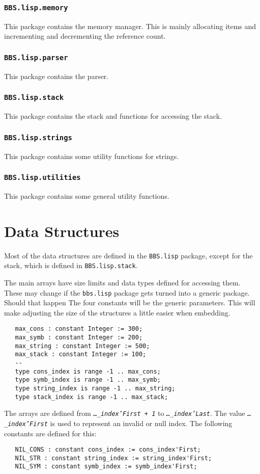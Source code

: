 \documentclass[10pt, openany]{book}
\newcommand{\package}[1]{\texttt{#1}}
\newcommand{\constant}[1]{\emph{\texttt{#1}}}
\newcommand{\keyword}[1]{\texttt{#1}}
\begin{document}
\subsubsection{\package{BBS.lisp.memory}}
This package contains the memory manager.  This is mainly allocating items and incrementing and decrementing the reference count.

\subsubsection{\package{BBS.lisp.parser}}
This package contains the parser.

\subsubsection{\package{BBS.lisp.stack}}
This package contains the stack and functions for accessing the stack.

\subsubsection{\package{BBS.lisp.strings}}
This package contains some utility functions for strings.

\subsubsection{\package{BBS.lisp.utilities}}
This package contains some general utility functions.


\section{Data Structures}
Most of the data structures are defined in the \package{BBS.lisp} package, except for the stack, which is defined in \package{BBS.lisp.stack}.

The main arrays have size limits and data types defined for accessing them.  These may change if the \keyword{bbs.lisp} package gets turned into a generic package.  Should that happen The four constants will be the generic parameters.  This will make adjusting the size of the structures a little easier when embedding.
\lstset{language=Ada}
\begin{lstlisting}
   max_cons : constant Integer := 300;
   max_symb : constant Integer := 200;
   max_string : constant Integer := 500;
   max_stack : constant Integer := 100;
   --
   type cons_index is range -1 .. max_cons;
   type symb_index is range -1 .. max_symb;
   type string_index is range -1 .. max_string;
   type stack_index is range -1 .. max_stack;
\end{lstlisting}
The arrays are defined from \constant{\ldots{}\_index'First + 1} to \constant{\ldots\_index'Last}.  The value \constant{\ldots\_index'First} is used to represent an invalid or null index.  The following constants are defined for this:
\begin{lstlisting}
   NIL_CONS : constant cons_index := cons_index'First;
   NIL_STR : constant string_index := string_index'First;
   NIL_SYM : constant symb_index := symb_index'First;
\end{lstlisting}
\end{document}
